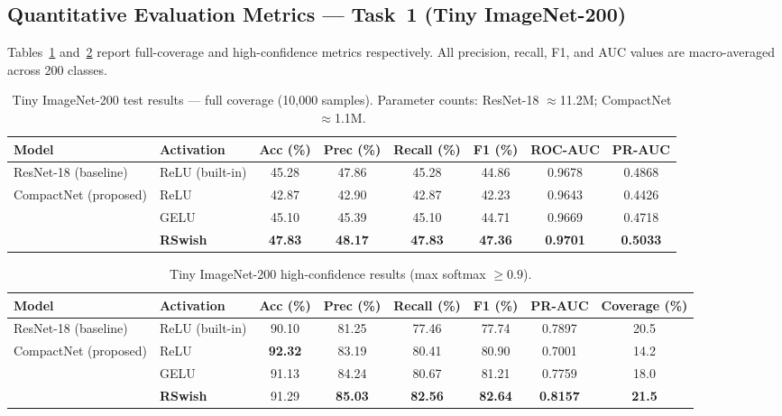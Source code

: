 \documentclass[11pt,letterpaper]{article}
\begin{document}
\subsection{Quantitative Evaluation Metrics --- Task~1 (Tiny ImageNet-200)}

Tables~\ref{tab:tiny_all} and~\ref{tab:tiny_conf} report full-coverage and
high-confidence metrics respectively.
All precision, recall, F1, and AUC values are macro-averaged across 200 classes.

\begin{table}[H]
  \centering
  \caption{Tiny ImageNet-200 test results --- full coverage (10{,}000 samples).
           Parameter counts: ResNet-18 $\approx$11.2M; CompactNet $\approx$1.1M.}
  \label{tab:tiny_all}
  \begin{tabular}{llcccccc}
    \toprule
    \textbf{Model} & \textbf{Activation} &
    \textbf{Acc (\%)} & \textbf{Prec (\%)} &
    \textbf{Recall (\%)} & \textbf{F1 (\%)} &
    \textbf{ROC-AUC} & \textbf{PR-AUC} \\
    \midrule
    ResNet-18 (baseline) & ReLU (built-in)
                    & 45.28 & 47.86 & 45.28 & 44.86 & 0.9678 & 0.4868 \\
    \midrule
    \multirow{3}{*}{CompactNet (proposed)}
                    & ReLU   & 42.87 & 42.90 & 42.87 & 42.23 & 0.9643 & 0.4426 \\
                    & GELU   & 45.10 & 45.39 & 45.10 & 44.71 & 0.9669 & 0.4718 \\
                    & \textbf{RSwish} & \textbf{47.83} & \textbf{48.17} & \textbf{47.83}
                    & \textbf{47.36} & \textbf{0.9701} & \textbf{0.5033} \\
    \bottomrule
  \end{tabular}
\end{table}

\begin{table}[H]
  \centering
  \caption{Tiny ImageNet-200 high-confidence results (max softmax $\geq 0.9$).}
  \label{tab:tiny_conf}
  \begin{tabular}{llcccccc}
    \toprule
    \textbf{Model} & \textbf{Activation} &
    \textbf{Acc (\%)} & \textbf{Prec (\%)} & \textbf{Recall (\%)} &
    \textbf{F1 (\%)} & \textbf{PR-AUC} & \textbf{Coverage (\%)} \\
    \midrule
    ResNet-18 (baseline) & ReLU (built-in)
                    & 90.10 & 81.25 & 77.46 & 77.74 & 0.7897 & 20.5 \\
    \midrule
    \multirow{3}{*}{CompactNet (proposed)}
                    & ReLU   & \textbf{92.32} & 83.19 & 80.41 & 80.90 & 0.7001 & 14.2 \\
                    & GELU   & 91.13 & 84.24 & 80.67 & 81.21 & 0.7759 & 18.0 \\
                    & \textbf{RSwish} & 91.29 & \textbf{85.03} & \textbf{82.56}
                    & \textbf{82.64} & \textbf{0.8157} & \textbf{21.5} \\
    \bottomrule
  \end{tabular}
\end{table}
\end{document}
